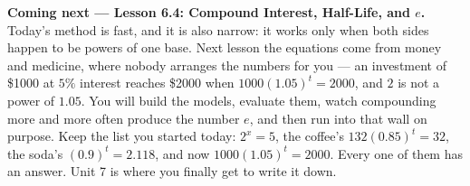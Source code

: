 \documentclass[10pt]{article}
\begin{document}
\begin{spiralbox}
\textbf{Coming next --- Lesson 6.4: Compound Interest, Half-Life, and $e$.} Today's method is fast, and
it is also narrow: it works only when both sides happen to be powers of one base. Next lesson the
equations come from money and medicine, where nobody arranges the numbers for you --- an investment of
\$1000 at $5\%$ interest reaches \$2000 when $1000(1.05)^{t}=2000$, and $2$ is not a power of $1.05$.
You will build the models, evaluate them, watch compounding more and more often produce the number
$e$, and then run into that wall on purpose. Keep the list you started today: $2^{x}=5$, the coffee's
$132(0.85)^{t}=32$, the soda's $(0.9)^{t}=2.118$, and now $1000(1.05)^{t}=2000$. Every one of them has
an answer. Unit 7 is where you finally get to write it down.
\end{spiralbox}
\end{document}
